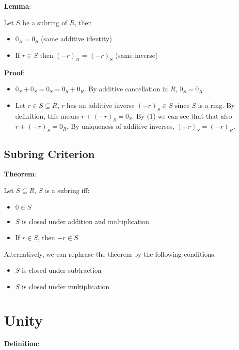 \documentclass{article}
\begin{document}
\begin{multicols*}{2}
\textbf{Lemma}:

Let $S$ be a subring of $R$, then

\begin{itemize}
    \item[(1)] $0_R = 0_S$ (same additive identity)
    \item[(2)] If $r \in S$ then $(-r)_R$ = $(-r)_S$ (same inverse)
\end{itemize}

\textbf{Proof}:

\begin{itemize}
    \item[(1)] $0_S + 0_S = 0_S = 0_S + 0_R$. By additive cancellation in $R$, $0_S = 0_R$.
    \item[(2)] Let $r \in S \subseteq R$, $r$ has an additive inverse $(-r)_S \in S$ since $S$ is a ring. By definition, this means $r + (-r)_S = 0_S$. By (1) we can see that that also $r + (-r)_S = 0_R$. By uniqueness of additive inverses, $(-r)_S = (-r)_R$.
\end{itemize}

\subsection{Subring Criterion}

\textbf{Theorem}:

Let $S \subseteq R$, $S$ is a subring iff:

\begin{itemize}
    \item[(1)] $0 \in S$
    \item[(2)] $S$ is closed under addition and multiplication
    \item[(3)] If $r \in S$, then $-r \in S$
\end{itemize}

Alternatively, we can rephrase the theorem by the following conditions:

\begin{itemize}
    \item[(a)] $S$ is closed under subtraction
    \item[(b)] $S$ is closed under multiplication
\end{itemize}

\section{Unity}

\textbf{Definition}:


\end{multicols*}
\end{document}
